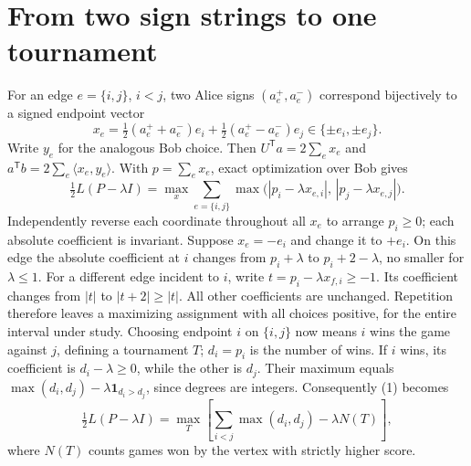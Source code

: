 \documentclass[11pt]{article}
\begin{document}
\section{From two sign strings to one tournament}
For an edge $e=\{i,j\}$, $i<j$, two Alice signs $(a_e^+,a_e^-)$ correspond bijectively to a signed endpoint vector
\[
 x_e=\tfrac12(a_e^++a_e^-)e_i+\tfrac12(a_e^+-a_e^-)e_j\in\{\pm e_i,\pm e_j\}.
\]
Write $y_e$ for the analogous Bob choice. Then $U^\mathsf{T}a=2\sum_e x_e$ and $a^\mathsf{T}b=2\sum_e\langle x_e,y_e\rangle$. With $p=\sum_e x_e$, exact optimization over Bob gives
\[
 \tfrac12L(P-\lambda I)=\max_x\sum_{e=\{i,j\}}\max\bigl( |p_i-\lambda x_{e,i}|,\,|p_j-\lambda x_{e,j}|\bigr). \tag{1}
\]
Independently reverse each coordinate throughout all $x_e$ to arrange $p_i\ge0$; each absolute coefficient is invariant. Suppose $x_e=-e_i$ and change it to $+e_i$. On this edge the absolute coefficient at $i$ changes from $p_i+\lambda$ to $p_i+2-\lambda$, no smaller for $\lambda\le1$. For a different edge incident to $i$, write $t=p_i-\lambda x_{f,i}\ge-1$. Its coefficient changes from $|t|$ to $|t+2|\ge|t|$. All other coefficients are unchanged. Repetition therefore leaves a maximizing assignment with all choices positive, for the entire interval under study.
Choosing endpoint $i$ on $\{i,j\}$ now means $i$ wins the game against $j$, defining a tournament $T$; $d_i=p_i$ is the number of wins. If $i$ wins, its coefficient is $d_i-\lambda\ge0$, while the other is $d_j$. Their maximum equals $\max(d_i,d_j)-\lambda\mathbf1_{d_i>d_j}$, since degrees are integers. Consequently (1) becomes
\[
 \tfrac12L(P-\lambda I)=\max_T\left[\sum_{i<j}\max(d_i,d_j)-\lambda N(T)\right],\tag{2}
\]
where $N(T)$ counts games won by the vertex with strictly higher score.
\end{document}
